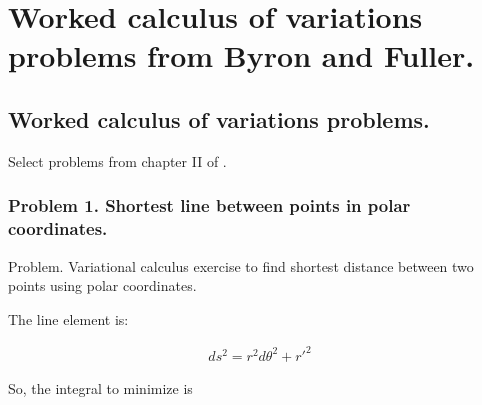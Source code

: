 
%
%





\chapter{Worked calculus of variations problems from Byron and Fuller. }
\label{chap:byronFullerCalcVar}
\date{ March 21, 2009.  $RCSfile: byronFullerCalcVar.tex,v $ Last $Revision: 1.20 $ $Date: 2009/06/14 23:51:45 $ }

%


\section{Worked calculus of variations problems. }

Select problems from chapter II of \citep{byron1992mca}.

\subsection{Problem 1.  Shortest line between points in polar coordinates. }

Problem.  Variational calculus exercise to find shortest distance between two points using polar coordinates.
 
The line element is:
 
\begin{align*}
ds^2 = r^2 d\theta^2 + {r'}^2
\end{align*}
 
So, the integral to minimize is
 

